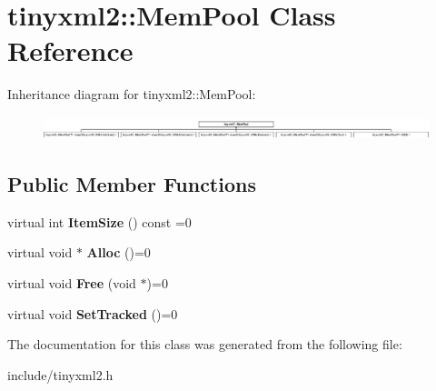 \hypertarget{classtinyxml2_1_1_mem_pool}{}\section{tinyxml2\+:\+:Mem\+Pool Class Reference}
\label{classtinyxml2_1_1_mem_pool}
Inheritance diagram for tinyxml2\+:\+:Mem\+Pool\+:\begin{figure}[H]
\begin{center}
\leavevmode
\includegraphics[height=0.691358cm]{classtinyxml2_1_1_mem_pool}
\end{center}
\end{figure}
\subsection*{Public Member Functions}
\begin{DoxyCompactItemize}
\item 
\hypertarget{classtinyxml2_1_1_mem_pool_a0c518d49e3a94bde566f61e13b7240bb}{}virtual int {\bfseries Item\+Size} () const =0\label{classtinyxml2_1_1_mem_pool_a0c518d49e3a94bde566f61e13b7240bb}

\item 
\hypertarget{classtinyxml2_1_1_mem_pool_a4f977b5fed752c0bbfe5295f469d6449}{}virtual void $\ast$ {\bfseries Alloc} ()=0\label{classtinyxml2_1_1_mem_pool_a4f977b5fed752c0bbfe5295f469d6449}

\item 
\hypertarget{classtinyxml2_1_1_mem_pool_a49e3bfac2cba2ebd6776b31e571f64f7}{}virtual void {\bfseries Free} (void $\ast$)=0\label{classtinyxml2_1_1_mem_pool_a49e3bfac2cba2ebd6776b31e571f64f7}

\item 
\hypertarget{classtinyxml2_1_1_mem_pool_ac5804dd1387b2e4de5eef710076a0db1}{}virtual void {\bfseries Set\+Tracked} ()=0\label{classtinyxml2_1_1_mem_pool_ac5804dd1387b2e4de5eef710076a0db1}

\end{DoxyCompactItemize}


The documentation for this class was generated from the following file\+:\begin{DoxyCompactItemize}
\item 
include/tinyxml2.\+h\end{DoxyCompactItemize}

